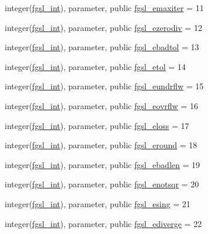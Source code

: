 \begin{DoxyCompactItemize}
integer(\hyperlink{namespacefgsl_a222deda1d7a0c0e845ce4a683318efeb}{fgsl\+\_\+int}), parameter, public \hyperlink{namespacefgsl_a5e63249fa198903f233261cb159a3e28}{fgsl\+\_\+emaxiter} = 11
\item 
integer(\hyperlink{namespacefgsl_a222deda1d7a0c0e845ce4a683318efeb}{fgsl\+\_\+int}), parameter, public \hyperlink{namespacefgsl_a13b65889d69077a99a6f13522883061f}{fgsl\+\_\+ezerodiv} = 12
\item 
integer(\hyperlink{namespacefgsl_a222deda1d7a0c0e845ce4a683318efeb}{fgsl\+\_\+int}), parameter, public \hyperlink{namespacefgsl_a3df3fe39582721655da00574f4b021d1}{fgsl\+\_\+ebadtol} = 13
\item 
integer(\hyperlink{namespacefgsl_a222deda1d7a0c0e845ce4a683318efeb}{fgsl\+\_\+int}), parameter, public \hyperlink{namespacefgsl_a7e4da7bbb4435c2bceff8cf57d554015}{fgsl\+\_\+etol} = 14
\item 
integer(\hyperlink{namespacefgsl_a222deda1d7a0c0e845ce4a683318efeb}{fgsl\+\_\+int}), parameter, public \hyperlink{namespacefgsl_ae5ac5a32777e537541e47cb0419da46c}{fgsl\+\_\+eundrflw} = 15
\item 
integer(\hyperlink{namespacefgsl_a222deda1d7a0c0e845ce4a683318efeb}{fgsl\+\_\+int}), parameter, public \hyperlink{namespacefgsl_a7dc79e0a3af443223d2320c5e2b7b803}{fgsl\+\_\+eovrflw} = 16
\item 
integer(\hyperlink{namespacefgsl_a222deda1d7a0c0e845ce4a683318efeb}{fgsl\+\_\+int}), parameter, public \hyperlink{namespacefgsl_afdf53f6a99fb8880de40cd8136bf8e1c}{fgsl\+\_\+eloss} = 17
\item 
integer(\hyperlink{namespacefgsl_a222deda1d7a0c0e845ce4a683318efeb}{fgsl\+\_\+int}), parameter, public \hyperlink{namespacefgsl_a46f7428fe03a54ce95e47c21d299a129}{fgsl\+\_\+eround} = 18
\item 
integer(\hyperlink{namespacefgsl_a222deda1d7a0c0e845ce4a683318efeb}{fgsl\+\_\+int}), parameter, public \hyperlink{namespacefgsl_ac1f16c63f7a3d224fceb2113566856f5}{fgsl\+\_\+ebadlen} = 19
\item 
integer(\hyperlink{namespacefgsl_a222deda1d7a0c0e845ce4a683318efeb}{fgsl\+\_\+int}), parameter, public \hyperlink{namespacefgsl_a0ad3f5a5023fcd60f764cab3b2b07984}{fgsl\+\_\+enotsqr} = 20
\item 
integer(\hyperlink{namespacefgsl_a222deda1d7a0c0e845ce4a683318efeb}{fgsl\+\_\+int}), parameter, public \hyperlink{namespacefgsl_aeb4c28b199599ec4c17ff7330a4ad10d}{fgsl\+\_\+esing} = 21
\item 
integer(\hyperlink{namespacefgsl_a222deda1d7a0c0e845ce4a683318efeb}{fgsl\+\_\+int}), parameter, public \hyperlink{namespacefgsl_a955eb5c7585781ffb9e336843a471566}{fgsl\+\_\+ediverge} = 22

\end{DoxyCompactItemize}
